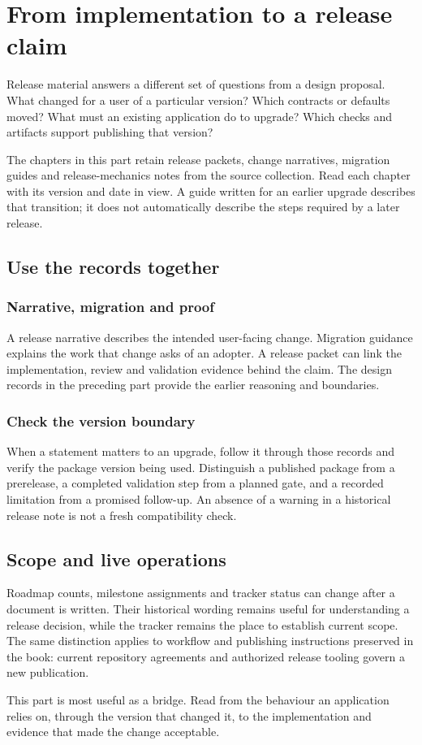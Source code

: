 \chapter*{From implementation to a release claim}

Release material answers a different set of questions from a design proposal. What changed for a user of a particular version? Which contracts or defaults moved? What must an existing application do to upgrade? Which checks and artifacts support publishing that version?

The chapters in this part retain release packets, change narratives, migration guides and release-mechanics notes from the source collection. Read each chapter with its version and date in view. A guide written for an earlier upgrade describes that transition; it does not automatically describe the steps required by a later release.

\section*{Use the records together}

\subsection*{Narrative, migration and proof}

A release narrative describes the intended user-facing change. Migration guidance explains the work that change asks of an adopter. A release packet can link the implementation, review and validation evidence behind the claim. The design records in the preceding part provide the earlier reasoning and boundaries.

\subsection*{Check the version boundary}

When a statement matters to an upgrade, follow it through those records and verify the package version being used. Distinguish a published package from a prerelease, a completed validation step from a planned gate, and a recorded limitation from a promised follow-up. An absence of a warning in a historical release note is not a fresh compatibility check.

\section*{Scope and live operations}

Roadmap counts, milestone assignments and tracker status can change after a document is written. Their historical wording remains useful for understanding a release decision, while the tracker remains the place to establish current scope. The same distinction applies to workflow and publishing instructions preserved in the book: current repository agreements and authorized release tooling govern a new publication.

This part is most useful as a bridge. Read from the behaviour an application relies on, through the version that changed it, to the implementation and evidence that made the change acceptable.
